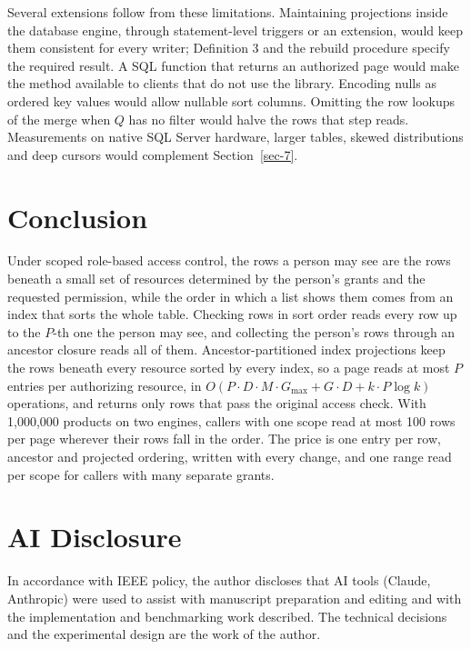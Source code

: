 \documentclass[conference]{IEEEtran}
\begin{document}
Several extensions follow from these limitations. Maintaining projections inside the database engine, through statement-level triggers or an extension, would keep them consistent for every writer; Definition 3 and the rebuild procedure specify the required result. A SQL function that returns an authorized page would make the method available to clients that do not use the library. Encoding nulls as ordered key values would allow nullable sort columns. Omitting the row lookups of the merge when \(Q\) has no filter would halve the rows that step reads. Measurements on native SQL Server hardware, larger tables, skewed distributions and deep cursors would complement Section~\ref{sec-7}.

\section{Conclusion}\label{sec-10}

Under scoped role-based access control, the rows a person may see are the rows beneath a small set of resources determined by the person's grants and the requested permission, while the order in which a list shows them comes from an index that sorts the whole table. Checking rows in sort order reads every row up to the \(P\)-th one the person may see, and collecting the person's rows through an ancestor closure reads all of them. Ancestor-partitioned index projections keep the rows beneath every resource sorted by every index, so a page reads at most \(P\) entries per authorizing resource, in \(O(P \cdot D \cdot M \cdot G_{\max} + G \cdot D + k \cdot P \log k)\) operations, and returns only rows that pass the original access check. With 1,000,000 products on two engines, callers with one scope read at most 100 rows per page wherever their rows fall in the order. The price is one entry per row, ancestor and projected ordering, written with every change, and one range read per scope for callers with many separate grants.

\section*{AI Disclosure}

In accordance with IEEE policy, the author discloses that AI tools (Claude, Anthropic) were used to assist with manuscript preparation and editing and with the implementation and benchmarking work described. The technical decisions and the experimental design are the work of the author.
\end{document}
